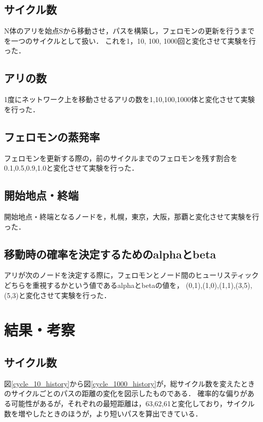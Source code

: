 \documentclass[11pt,a4paper]{jsarticle}
\begin{document}
\subsection*{サイクル数}

N体のアリを始点Sから移動させ，パスを構築し，フェロモンの更新を行うまでを一つのサイクルとして扱い．
これを1，10, 100, 1000回と変化させて実験を行った．

\subsection*{アリの数}

1度にネットワーク上を移動させるアリの数を1,10,100,1000体と変化させて実験を行った．

\subsection*{フェロモンの蒸発率}

フェロモンを更新する際の，前のサイクルまでのフェロモンを残す割合を0.1,0.5,0.9,1.0と変化させて実験を行った．

\subsection*{開始地点・終端}

開始地点・終端となるノードを，札幌，東京，大阪，那覇と変化させて実験を行った．

\subsection*{移動時の確率を決定するためのalphaとbeta}

アリが次のノードを決定する際に，フェロモンとノード間のヒューリスティックどちらを重視するかという値であるalphaとbetaの値を，
(0,1),(1,0),(1,1),(3,5),(5,3)と変化させて実験を行った．

\section{結果・考察}

\subsection{サイクル数}

図\ref{cycle_10_history}から図\ref{cycle_1000_history}が，総サイクル数を変えたときのサイクルごとのパスの距離の変化を図示したものである．
確率的な偏りがある可能性があるが，それぞれの最短距離は，63,62,61と変化しており，サイクル数を増やしたときのほうが，より短いパスを算出できている．
\end{document}
